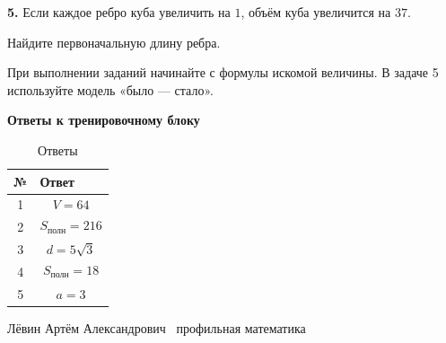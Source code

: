 \documentclass[a4paper,12pt]{article}
\begin{document}
\vspace{5mm}

\textbf{5.}
Если каждое ребро куба увеличить на \(1\),
объём куба увеличится на \(37\).

Найдите первоначальную длину ребра.

\vfill

{\small\color{softgray}
При выполнении заданий начинайте с формулы искомой величины.
В задаче 5 используйте модель «было --- стало».
}

\clearpage
\thispagestyle{fancy}

\begin{center}

{\LARGE\bfseries\color{darkaccent}
Ответы к тренировочному блоку
}

\end{center}

\vspace{9mm}

\begin{table}[h]
\centering
\caption{Ответы}

\renewcommand{\arraystretch}{1.45}

\begin{tabularx}{0.88\linewidth}{@{}c X@{}}
\toprule

\textbf{№}
&
\textbf{Ответ}
\\

\midrule

1
&
\[
V=64
\]
\\

2
&
\[
S_{\text{полн}}=216
\]
\\

3
&
\[
d=5\sqrt3
\]
\\

4
&
\[
S_{\text{полн}}=18
\]
\\

5
&
\[
a=3
\]
\\

\bottomrule
\end{tabularx}

\end{table}

\vfill

\begin{center}

{\small\color{softgray}
Лёвин Артём Александрович
\textbullet\
профильная математика
}

\end{center}
\end{document}
